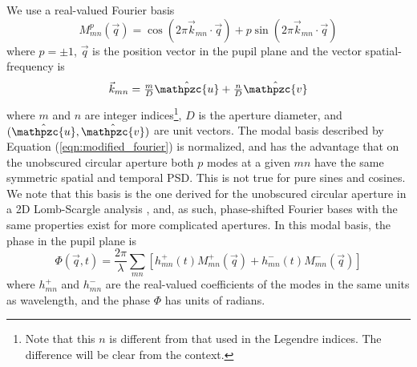\documentclass[10pt,preprint]{aastex631}
\begin{document}
We use a real-valued Fourier basis
\begin{equation}
M_{mn}^p(\vec{q}) = \cos(2\pi \vec{k}_{mn} \cdot \vec{q}) + p  \sin(2\pi \vec{k}_{mn} \cdot \vec{q})
\label{eqn:modified_fourier}
\end{equation}
where $p=\pm 1$, $\vec{q}$ is the position vector in the pupil plane and the vector spatial-frequency is 
\begin{equation}
\textstyle\vec{k}_{mn} = \textstyle\frac{m}{D} \hat{\mathpzc{u}} + \textstyle\frac{n}{D} \hat{\mathpzc{v}}
\label{eqn:kq_def}
\end{equation}
where $m$ and $n$ are integer indices\footnote{Note that this $n$ is different from that used in the Legendre indices.  The difference will be clear from the context.}, $D$ is the aperture diameter, and $(\hat{\mathpzc{u}},\hat{\mathpzc{v}})$ are unit vectors.  The modal basis described by Equation (\ref{eqn:modified_fourier}) is normalized, and has the advantage that on the unobscured circular aperture both $p$ modes at a given $mn$ have the same symmetric spatial and temporal PSD.  This is not true for pure sines and cosines.  We note that this basis is the one derived for the unobscured circular aperture in a 2D Lomb-Scargle analysis \citep{2020arXiv200110200S}, and, as such, phase-shifted Fourier bases with the same properties exist for more complicated apertures.  In this modal basis, the phase in the pupil plane is
\begin{equation}
\Phi(\vec{q},t) = \frac{2\pi}{\lambda} \sum\limits_{mn} \left[ h_{mn}^{+}(t) M_{mn}^{+}(\vec{q}) + h_{mn}^{-}(t) M_{mn}^{-}(\vec{q})\right]
\label{eqn:phi_expansion}
\end{equation}
where $h_{mn}^{+}$ and $h_{mn}^{-}$ are the real-valued coefficients of the modes in the same units as wavelength, and the phase $\Phi$ has units of radians.
\end{document}
